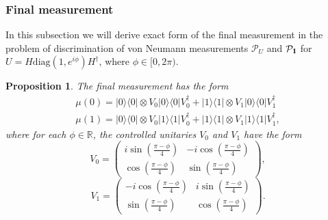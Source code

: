 \documentclass[preprint,12pt, a4paper]{elsarticle}
\newcommand{\ket}[1]{\ensuremath{|#1\rangle}}
\newcommand{\bra}[1]{\ensuremath{\langle#1|}}
\newcommand{\ketbra}[2]{\ensuremath{\ket{#1}\bra{#2}}}
\newcommand{\proj}[1]{\ensuremath{\ketbra{#1}{#1}}}
\newcommand{\1}{{\rm 1\hspace{-0.9mm}l}}
\newcommand{\Id}{{\rm 1\hspace{-0.9mm}l}}
\newcommand{\PP}{\mathcal{P}}
\newcommand{\diag}{\mathrm{diag}}
\newtheorem{proposition}{Proposition}
\begin{document}
\subsubsection{Final measurement}\label{sec_example_final_measurement}
In this subsection we will derive exact form of the final measurement in the
problem of discrimination of von Neumann measurements $\PP_U$ and $\PP_{\Id}$
for $U = H \diag(1, e^{i \phi}) H^\dagger$, where $\phi \in [0, 2\pi)$.


\begin{proposition}
The  final measurement has the form
\begin{equation}
\begin{split}
\mu(0) = \proj{0} \otimes V_0 \proj{0} V_0^\dagger +  \proj{1} \otimes V_1 
\proj{0} V_1^\dagger  \\ 
\mu(1) = \proj{0} \otimes V_0 \proj{1} V_0^\dagger +  \proj{1} \otimes V_1 
\proj{1} V_1^\dagger,
\end{split}
\end{equation}
where for each $\phi \in \mathbb{R}$,  the controlled unitaries $V_0$ and $V_1$ 
have the form
\begin{equation}
V_0 = \left(\begin{array}{cc}i \sin\left( \frac{\pi - \phi}{4} \right)&-i 
\cos\left( \frac{\pi - \phi}{4} \right)\\ \cos\left( \frac{\pi - 
\phi}{4}\right)& \sin\left( \frac{\pi - \phi}{4} \right)\end{array}\right),
\end{equation}
\begin{equation}
V_1 = \left(\begin{array}{cc}-i \cos\left(\frac{\pi - \phi}{4}\right) &i 
\sin\left( \frac{\pi - \phi}{4}\right)\\\sin\left( \frac{\pi - \phi}{4} \right) 
&  \cos\left( \frac{\pi - \phi}{4} \right) \end{array}\right).
\end{equation}
\end{proposition}
\end{document}
